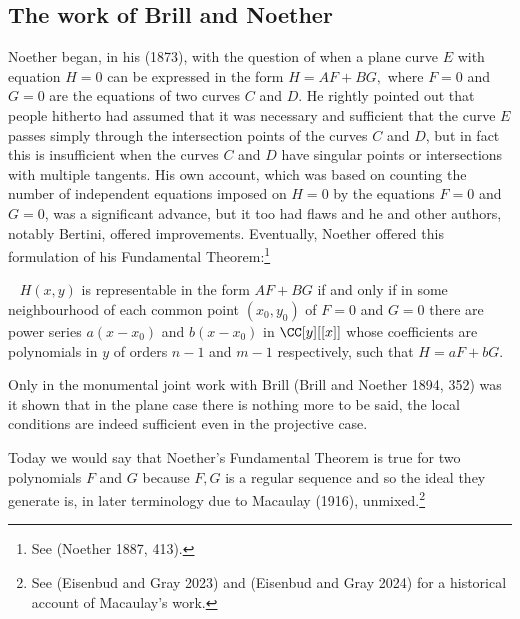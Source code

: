 \subsection{The work of Brill and Noether}
Noether began, in his (1873), with the question of when  a plane curve $E$ with equation $H=0$ can be expressed in the form $H = AF+BG,$ where $F=0$ and $G=0$ are the equations of two curves $C$ and $D.$ He rightly pointed out that people hitherto had assumed that it was necessary and sufficient that the curve $E$  passes simply through the intersection points of the curves $C$ and $D$, but in fact this is insufficient when the curves $C$ and $D$ have singular points or intersections with multiple tangents. His own account, which was based on counting the number of independent equations imposed on $H=0$ by the equations $F=0$ and $G=0$, was a significant advance, but it too had flaws and he and other authors, notably Bertini, offered improvements. Eventually, Noether  offered this formulation of his  Fundamental Theorem\label{Noether'sFT}:\footnote{See (Noether 1887, 413).}
\begin{theorem}~\label{NFT1887}
$H(x, y)$ is representable in the form $AF + BG$ if and only if in some neighbourhood of each common point $(x_0, y_0)$ of $F=0$ and $G=0$ there are power series $a(x-x_0)$ and $b(x-x_0)$ in $\CC[y][[x]]$ whose coefficients are polynomials in $y$ of orders  $n-1$ and $m-1$ respectively, such that $H = aF + bG.$ 
\end{theorem}
Only in the monumental joint work with Brill (Brill and Noether 1894, 352) was it shown that in the plane case there is nothing more to be said, the local conditions are indeed sufficient even in the projective case.


Today we would say that Noether's Fundamental Theorem is true for two polynomials $F$ and $G$ because $F,G$ is a regular sequence  and so  the ideal they generate is, in later terminology due to Macaulay (1916), unmixed.\footnote{See (Eisenbud and Gray 2023) and (Eisenbud and Gray 2024) for a historical account of Macaulay's work.}


